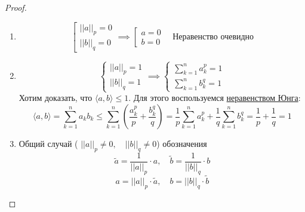 \documentclass[../main.tex]{subfiles}
\begin{document}
\begin{proof}

    ~

    \begin{enumerate}
        \item 
        \begin{equation*}
            \left[
            \begin{gathered}
                \left| \left| a\right|\right|_p=0\\ 
                \left| \left| b\right|\right|_q=0
            \end{gathered}
            \right.
            \implies 
            \left[
            \begin{gathered}
                a=0\\ 
                b=0
            \end{gathered}
            \right.
            \quad
            \text{Неравенство очевидно}
        \end{equation*}
        \item \begin{equation*}
            \begin{cases}
                \left| \left| a\right|\right|_p=1\\ 
                \left| \left| b\right|\right|_q=1
            \end{cases}
            \implies 
            \begin{cases}
                \sum\limits_{ k=1}^{ n} a_k^p=1\\ 
                \sum\limits_{ k=1}^{ n} b_k^q=1
            \end{cases}
        \end{equation*}
        Хотим доказать, что \( \langle a, b \rangle \leq 1\). Для этого воспользуемся \hyperlink{thm:Yung}{неравенством Юнга}:
        \[ \langle a, b \rangle = \sum\limits_{ k=1}^{ n} a_kb_k \leq \sum\limits_{ k=1}^{ n} \left( \dfrac{ a_k^p}{ p}+ \dfrac{ b_k^q}{ q}\right)= \dfrac{ 1}{ p} \sum\limits_{ k=1}^{ n} a_k^p+ \dfrac{ 1}{ q} \sum\limits_{ k=1}^{ n} b_k^q= \dfrac{ 1}{ p}+ \dfrac{ 1}{ q} =1\]
        \item Общий случай ( \( \left| \left| a\right|\right|_p \neq 0,\quad \left| \left| b\right|\right|_q \neq 0\))
         обозначения
        \[ \tilde{ a}= \dfrac{ 1}{ \left| \left| a\right|\right|_p}\cdot a,\quad \tilde{ b}= \dfrac{ 1}{ \left| \left| b\right|\right|_q}\cdot b\]
        \[ a=\left| \left| a\right|\right|_p \cdot \tilde{ a},\quad b=\left| \left| b\right|\right|_q \cdot \tilde{ b}\]

\end{enumerate}
\end{proof}
\end{document}

